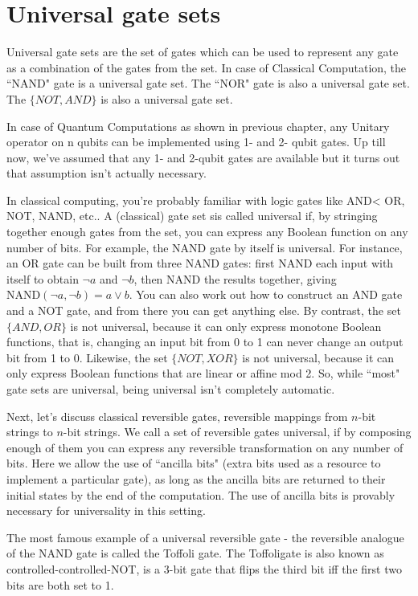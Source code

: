 \section{Universal gate sets}
Universal gate sets are the set of gates which can be used to represent any gate as a combination of the gates from the set.
In case of Classical Computation, the ``NAND" gate is a universal gate set. The ``NOR" gate is also a universal gate set. The $\{NOT, AND\}$ is also a universal gate set.
 
In case of Quantum Computations as shown in previous chapter, any Unitary operator on n qubits can be implemented using 1- and 2- qubit gates. Up till now, we've assumed that any 1- and 2-qubit gates are available but it turns out that assumption isn't actually necessary.

In classical computing, you're probably familiar with logic gates like AND< OR, NOT, NAND, etc.. A (classical) gate set sis called universal if, by stringing together enough gates from the set, you can express any Boolean function on any number of bits. For example, the NAND gate by itself is universal. For instance, an OR gate can be built from three NAND gates: first NAND each input with itself to obtain $\lnot a$ and $\lnot b$, then NAND the results together, giving $\mathrm{NAND}(\lnot a, \lnot b) = a \lor b$. You can also work out how to construct an AND gate and a NOT gate, and from there you can get anything else. By contrast, the set $\{AND,OR\}$ is not universal, because it can only express monotone Boolean functions, that is, changing an input bit from 0 to 1 can never change an output bit from 1 to 0. Likewise, the set $\{NOT,XOR\}$ is not universal, because it can only express Boolean functions that are linear or affine mod 2. So, while ``most" gate sets are universal, being universal isn't completely automatic.

Next, let's discuss classical reversible gates, reversible mappings from $n$-bit strings to $n$-bit strings. We call a set of reversible gates universal, if by composing enough of them you can express any reversible transformation on any number of bits. Here we allow the use of ``ancilla bits" (extra bits used as a resource to implement a particular gate), as long as the ancilla bits are returned to their initial states by the end of the computation. The use of ancilla bits is provably necessary for universality in this setting.

The most famous example of a universal reversible gate - the reversible analogue of the NAND gate is called the Toffoli gate. The Toffoligate is also known as controlled-controlled-NOT, is a 3-bit gate that flips the third bit iff the first two bits are both set to 1.

